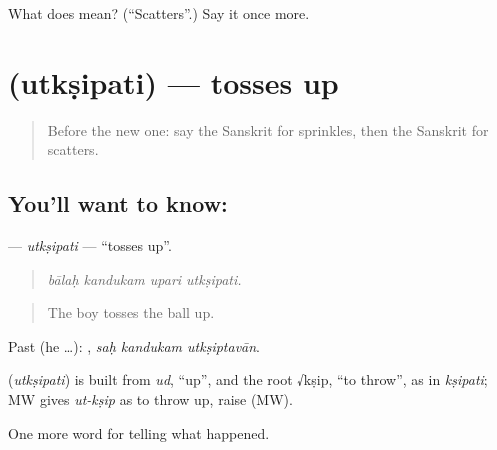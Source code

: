\begin{tcolorbox}[breakable,colback=teal!4,colframe=teal!35!black,title={Before you move on}]
What does  mean? (\textquotedblleft{}Scatters\textquotedblright{}.) Say it once more.
\end{tcolorbox}
\section[\texorpdfstring{\sk{उत्क्षिपति} (utkṣipati)}{उत्क्षिपति (utkṣipati)}]{ (utkṣipati) — tosses up}

\label{lesson:SA-C327-utksipati}



\begin{quote}
Before the new one: say the Sanskrit for sprinkles, then the Sanskrit for scatters.
\end{quote}

\subsection*{You'll want to know: }
\textbf{} — \emph{utkṣipati} — \textquotedblleft{}tosses up\textquotedblright{}.

\begin{quote}
   
\end{quote}

\begin{quote}
\emph{bālaḥ kandukam upari utkṣipati.}
\end{quote}

\begin{quote}
The boy tosses the ball up.
\end{quote}

Past (he …):   , \emph{saḥ kandukam utkṣiptavān}.

\begin{cousinweb}
\textbf{} (\emph{utkṣipati}) is built from \emph{ud}, \textquotedblleft{}up\textquotedblright{}, and the root √kṣip, \textquotedblleft{}to throw\textquotedblright{}, as in \emph{kṣipati}; MW gives \emph{ut-kṣip} as to throw up, raise (MW).
\end{cousinweb}

\begin{grammarlens}[title={What you've built}]
One more word for telling what happened.
\end{grammarlens}

